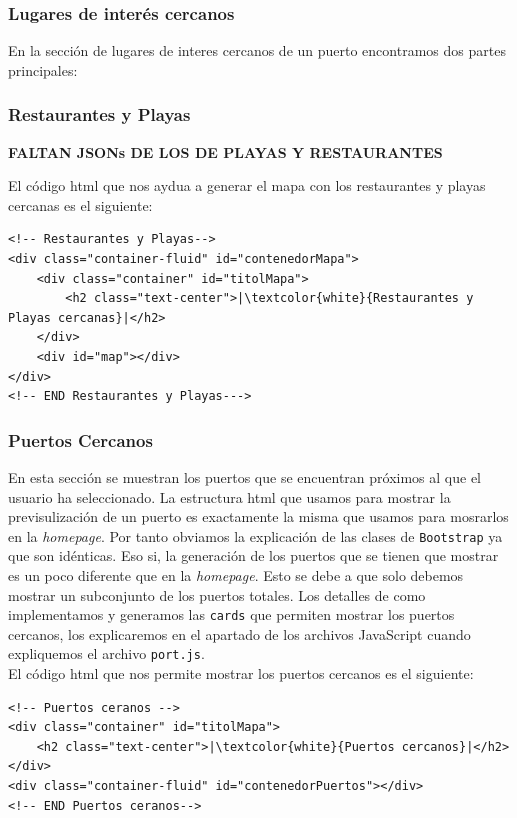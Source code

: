 \documentclass{article}
\begin{document}
\subsubsection{Lugares de interés cercanos}
En la sección de lugares de interes cercanos de un puerto encontramos dos partes principales:

\subsubsection{Restaurantes y Playas}
\textbf{FALTAN JSONs DE LOS DE PLAYAS Y RESTAURANTES}

\noindent El código html que nos aydua a generar el mapa con los restaurantes y playas cercanas es el siguiente:
\begin{verbatim}
<!-- Restaurantes y Playas-->
<div class="container-fluid" id="contenedorMapa">
    <div class="container" id="titolMapa">
        <h2 class="text-center">|\textcolor{white}{Restaurantes y Playas cercanas}|</h2>
    </div>
    <div id="map"></div>
</div>
<!-- END Restaurantes y Playas--->
\end{verbatim}

\subsubsection{Puertos Cercanos}
En esta sección se muestran los puertos que se encuentran próximos al que el usuario ha seleccionado. La estructura html que usamos para mostrar la previsulización de un puerto es exactamente la misma que usamos para mosrarlos en la \textit{homepage}. Por tanto obviamos la explicación de las clases de \texttt{Bootstrap} ya que son idénticas. Eso si, la generación de los puertos que se tienen que mostrar es un poco diferente que en la \textit{homepage}. Esto se debe a que solo debemos mostrar un subconjunto de los puertos totales. Los detalles de como implementamos y generamos las \texttt{cards} que permiten mostrar los puertos cercanos, los explicaremos en el apartado de los archivos JavaScript cuando expliquemos el archivo \texttt{port.js}.\\

\noindent El código html que nos permite mostrar los puertos cercanos es el siguiente:
\begin{verbatim}
<!-- Puertos ceranos -->
<div class="container" id="titolMapa">
    <h2 class="text-center">|\textcolor{white}{Puertos cercanos}|</h2>
</div>
<div class="container-fluid" id="contenedorPuertos"></div>
<!-- END Puertos ceranos-->
\end{verbatim}
\end{document}

